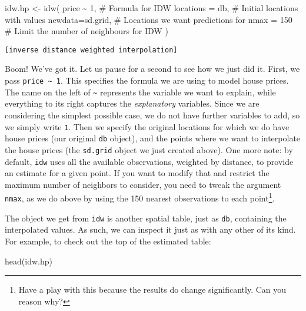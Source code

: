\documentclass[
  letterpaper,
  krantz2]{style/krantz}
\newenvironment{Shaded}{\begin{snugshade}}{\end{snugshade}}
\newcommand{\AttributeTok}[1]{\textcolor[rgb]{0.40,0.45,0.13}{#1}}
\newcommand{\CommentTok}[1]{\textcolor[rgb]{0.37,0.37,0.37}{#1}}
\newcommand{\DecValTok}[1]{\textcolor[rgb]{0.68,0.00,0.00}{#1}}
\newcommand{\FunctionTok}[1]{\textcolor[rgb]{0.28,0.35,0.67}{#1}}
\newcommand{\NormalTok}[1]{\textcolor[rgb]{0.00,0.23,0.31}{#1}}
\newcommand{\OtherTok}[1]{\textcolor[rgb]{0.00,0.23,0.31}{#1}}
\newcommand{\SpecialCharTok}[1]{\textcolor[rgb]{0.37,0.37,0.37}{#1}}
\begin{document}
\begin{Shaded}
\begin{Highlighting}[]
\NormalTok{idw.hp }\OtherTok{\textless{}{-}} \FunctionTok{idw}\NormalTok{(}
\NormalTok{  price }\SpecialCharTok{\textasciitilde{}} \DecValTok{1}\NormalTok{,         }\CommentTok{\# Formula for IDW}
  \AttributeTok{locations =}\NormalTok{ db,    }\CommentTok{\# Initial locations with values}
  \AttributeTok{newdata=}\NormalTok{sd.grid,   }\CommentTok{\# Locations we want predictions for}
  \AttributeTok{nmax =} \DecValTok{150}         \CommentTok{\# Limit the number of neighbours for IDW}
\NormalTok{)}
\end{Highlighting}
\end{Shaded}

\begin{verbatim}
[inverse distance weighted interpolation]
\end{verbatim}

Boom! We've got it. Let us pause for a second to see how we just did it.
First, we pass \texttt{price\ \textasciitilde{}\ 1}. This specifies the
formula we are using to model house prices. The name on the left of
\texttt{\textasciitilde{}} represents the variable we want to explain,
while everything to its right captures the \emph{explanatory} variables.
Since we are considering the simplest possible case, we do not have
further variables to add, so we simply write \texttt{1}. Then we specify
the original locations for which we do have house prices (our original
\texttt{db} object), and the points where we want to interpolate the
house prices (the \texttt{sd.grid} object we just created above). One
more note: by default, \texttt{idw} uses all the available observations,
weighted by distance, to provide an estimate for a given point. If you
want to modify that and restrict the maximum number of neighbors to
consider, you need to tweak the argument \texttt{nmax}, as we do above
by using the 150 nearest observations to each point\footnote{Have a play
  with this because the results do change significantly. Can you reason
  why?}.

The object we get from \texttt{idw} is another spatial table, just as
\texttt{db}, containing the interpolated values. As such, we can inspect
it just as with any other of its kind. For example, to check out the top
of the estimated table:

\begin{Shaded}
\begin{Highlighting}[]
\FunctionTok{head}\NormalTok{(idw.hp)}
\end{Highlighting}
\end{Shaded}
\end{document}
